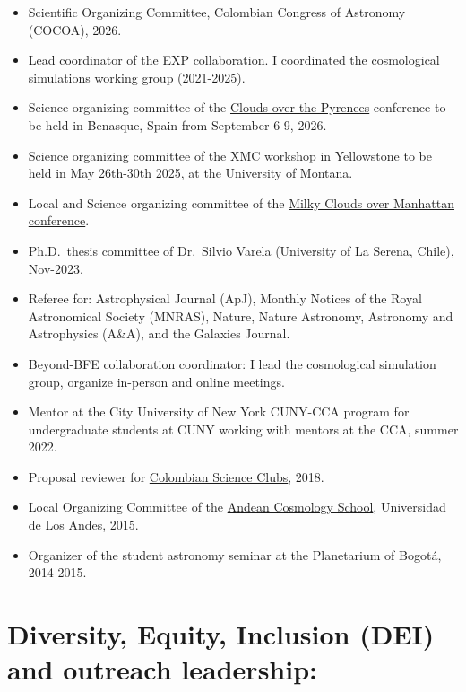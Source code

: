 \documentclass[14pt]{article}
\begin{document}
\begin{itemize}
  \setlength\itemsep{0.0em}
  \renewcommand\labelitemi{$\cdot$}

\item Scientific Organizing Committee, Colombian Congress of Astronomy (COCOA), 2026.
\item Lead coordinator of the EXP collaboration. I coordinated the cosmological simulations working group (2021-2025). 
\item Science organizing committee of the  \href{https://benasque.org/new_general/cgi-bin/years.pl?ano=2026}{Clouds over
  the Pyrenees} conference to be held in Benasque, Spain from September 6-9, 2026. 
  \item Science organizing committee of the XMC workshop in Yellowstone to be held
  in May 26th-30th 2025, at the University of Montana. 
\item Local and Science organizing committee of the \href{https://events.simonsfoundation.org/event/1f18ba51-d6da-414f-b492-9590f29ad048/summary}{Milky Clouds over Manhattan conference}. 
\item Ph.D.\ thesis committee of Dr.\ Silvio Varela (University of La Serena, Chile), Nov-2023. 
\item Referee for: Astrophysical Journal (ApJ), Monthly Notices of the Royal  Astronomical Society (MNRAS), Nature, Nature Astronomy, Astronomy and
  Astrophysics (A\&A), and the Galaxies Journal.
\item Beyond-BFE collaboration coordinator: I lead the cosmological simulation group, organize in-person and online meetings.
\item Mentor at the City University of New York CUNY-CCA program for undergraduate students at CUNY working with mentors at the CCA, summer 2022. 
\item Proposal reviewer for \href{https://clubesdeciencia.co/}{Colombian Science Clubs}, 2018.
\item Local Organizing Committee of the \href{http://forero.github.io/AndeanCosmologySchool/}{Andean Cosmology School}, Universidad de Los Andes, 2015.
\item Organizer of the student astronomy seminar at the Planetarium of Bogot\'a, 2014-2015.
\end{itemize}


\section*{Diversity, Equity, Inclusion (DEI) and outreach leadership:}
\end{document}
